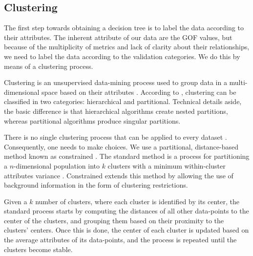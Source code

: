 
\subsection{Clustering}
\label{sec:clustering}

The first step towards obtaining a decision tree is to label the data according to their attributes. The inherent attribute of our data are the GOF values, but because of the multiplicity of metrics and lack of clarity about their relationships, we need to label the data according to the validation categories. We do this by means of a clustering process. 

Clustering is an unsupervised data-mining process used to group data in a multi-dimensional space based on their attributes \citep{Fayyad_1996_IEEE}. According to \citet{Jain_1999_ACMCS}, clustering can be classified in two categories: hierarchical and partitional. Technical details aside, the basic difference is that hierarchical algorithms create nested partitions, whereas partitional algorithms produce singular partitions. 

There is no single clustering process that can be applied to every dataset \citep{Dy_2004_MLR, Jain_1988_Book, Hartigan_1985_JOC}. Consequently, one needs to make choices. We use a partitional, distance-based method known as constrained \kmeans{}. The standard \kmeans{} method is a process for partitioning a $n$-dimensional population into $k$ clusters with a minimum within-cluster attributes variance \citep[e.g.,][]{Macqueen_1967_Proc}. Constrained \kmeans{} extends this method by allowing the use of background information in the form of clustering restrictions.

Given a $k$ number of clusters, where each cluster is identified by its center, the standard process starts by computing the distances of all other data-points to the center of the clusters, and grouping them based on their proximity to the clusters' centers. Once this is done, the center of each cluster is updated based on the average attributes of its data-points, and the process is repeated until the clusters become stable.


